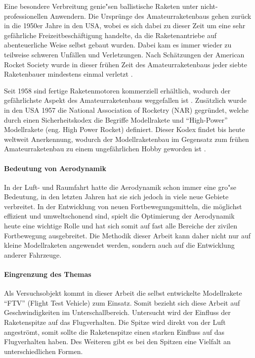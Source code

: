 \documentclass[10pt,a4paper]{article}
\begin{document}
Eine besondere Verbreitung genie"sen ballistische Raketen unter nicht-professionellen Anwendern. Die Ursprünge des Amateurraketenbaus gehen zurück in die 1950er Jahre in den USA, wobei es sich dabei zu dieser Zeit um eine sehr gefährliche Freizeitbeschäftigung handelte, da die Raketenantriebe auf abenteuerliche Weise selbst gebaut wurden. Dabei kam es immer wieder zu teilweise schweren Unfällen und Verletzungen. Nach Schätzungen der American Rocket Society wurde in dieser frühen Zeit des Amateurraketenbaus jeder siebte Raketenbauer mindestens einmal verletzt \cite{om,sn}.

Seit 1958 sind fertige Raketenmotoren kommerziell erhältlich, wodurch der gefährlichste Aspekt des Amateurraketenbaus weggefallen ist \cite{sn}. Zusätzlich wurde in den USA 1957 die National Association of Rocketry (NAR) gegründet, welche durch einen Sicherheitskodex die Begriffe Modellrakete und "`High-Power"' Modellrakete (eng. High Power Rocket) definiert. Dieser Kodex findet bis heute weltweit Anerkennung, wodurch der Modellraketenbau im Gegensatz zum frühen Amateurraketenbau zu einem ungefährlichen Hobby geworden ist \cite{om}.

\paragraph{Bedeutung von Aerodynamik}
In der Luft- und Raumfahrt hatte die Aerodynamik schon immer eine gro"se Bedeutung, in den letzten Jahren hat sie sich jedoch in viele neue Gebiete verbreitet. In der Entwicklung von neuen Fortbewegungsmitteln, die möglichst effizient und umweltschonend sind, spielt die Optimierung der Aerodynamik heute eine wichtige Rolle und hat sich somit auf fast alle Bereiche der zivilen Fortbewegung ausgebreitet. Die Methodik dieser Arbeit kann daher nicht nur auf kleine Modellraketen angewendet werden, sondern auch auf die Entwicklung anderer Fahrzeuge.

\paragraph{Eingrenzung des Themas}
Als Versuchsobjekt kommt in dieser Arbeit die selbst entwickelte Modellrakete "`FTV"' (Flight Test Vehicle) zum Einsatz. Somit bezieht sich diese Arbeit auf Geschwindigkeiten im Unterschallbereich.
Untersucht wird der Einfluss der Raketenspitze auf das Flugverhalten. Die Spitze wird direkt von der Luft angeströmt, somit sollte die Raketenspitze einen starken Einfluss auf das Flugverhalten haben. Des Weiteren gibt es bei den Spitzen eine Vielfalt an unterschiedlichen Formen. 
\end{document}
